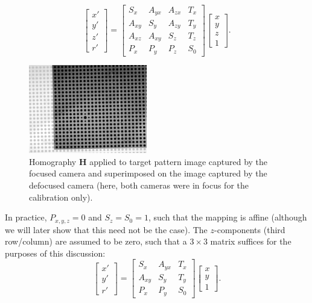 \documentclass[floatfix,aip,rsi,reprint,graphicx]{revtex4-1}
\begin{document}
\begin{equation}
\left[\begin{array}{c} x'\\ y'\\ z'\\ r' \end{array} \right]
=
\left[ \begin{array}{cccc}
S_x & A_{yx} & A_{zx} & T_x \\
A_{xy} & S_y & A_{zy} & T_y \\
A_{xz} & A_{xy} & S_z & T_z \\
P_x & P_y & P_z & S_0
\end{array} \right]
\left[ \begin{array}{c} x\\ y \\ z \\ 1 \end{array} \right].
\end{equation}
\begin{figure}
    \centering
    \includegraphics[width=0.46\textwidth]{orb_images/plate-calibration.jpg}
    \caption{Homography $\mathbf{H}$ applied to target pattern image captured by
        the focused camera and superimposed on the image captured by the
        defocused camera (here, both cameras were in focus for the calibration
        only).
    \label{fig:plate-calibration}}
\end{figure}
In practice, $P_{x,y,z} = 0$ and $S_z = S_0 = 1$, such that the mapping is
affine (although we will later show that this need not be the case). The
$z$-components (third row/column) are assumed to be zero, such that a $3 \times 3$ matrix
suffices for the purposes of this discussion:
\begin{equation}
\left[\begin{array}{c} x'\\ y'\\ r' \end{array} \right]
=
\left[ \begin{array}{ccc}
S_x & A_{yx} &  T_x \\
A_{xy} & S_y &  T_y \\
P_x & P_y & S_0
\end{array} \right]
\left[ \begin{array}{c} x\\ y \\ 1 \end{array} \right].
\end{equation}
\end{document}
